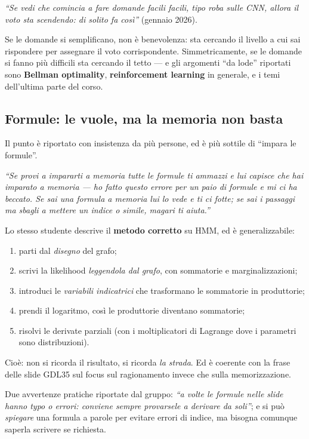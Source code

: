 \begin{tcolorbox}[mybox, title={Il segnale che il voto sta scendendo}]
\emph{``Se vedi che comincia a fare domande facili facili, tipo roba sulle CNN, allora il voto sta scendendo: di solito fa così''} (gennaio 2026).

Se le domande si semplificano, non è benevolenza: sta cercando il livello a cui sai rispondere per assegnare il voto corrispondente. Simmetricamente, se le domande si fanno più difficili sta cercando il tetto — e gli argomenti ``da lode'' riportati sono \textbf{Bellman optimality}, \textbf{reinforcement learning} in generale, e i temi dell'ultima parte del corso.
\end{tcolorbox}

\subsection*{Formule: le vuole, ma la memoria non basta}

Il punto è riportato con insistenza da più persone, ed è più sottile di ``impara le formule''.

\emph{``Se provi a impararti a memoria tutte le formule ti ammazzi e lui capisce che hai imparato a memoria --- ho fatto questo errore per un paio di formule e mi ci ha beccato. Se sai una formula a memoria lui lo vede e ti ci fotte; se sai i passaggi ma sbagli a mettere un indice o simile, magari ti aiuta.''}

Lo stesso studente descrive il \textbf{metodo corretto} su HMM, ed è generalizzabile:
\begin{enumerate}[leftmargin=2em]
  \item parti dal \emph{disegno} del grafo;
  \item scrivi la likelihood \emph{leggendola dal grafo}, con sommatorie e marginalizzazioni;
  \item introduci le \emph{variabili indicatrici} che trasformano le sommatorie in produttorie;
  \item prendi il logaritmo, così le produttorie diventano sommatorie;
  \item risolvi le derivate parziali (con i moltiplicatori di Lagrange dove i parametri sono distribuzioni).
\end{enumerate}
Cioè: non si ricorda il risultato, si ricorda \emph{la strada}. Ed è coerente con la frase delle slide GDL35 sul focus sul ragionamento invece che sulla memorizzazione.

Due avvertenze pratiche riportate dal gruppo: \emph{``a volte le formule nelle slide hanno typo o errori: conviene sempre provarsele a derivare da soli''}; e si può \emph{spiegare} una formula a parole per evitare errori di indice, ma bisogna comunque saperla scrivere se richiesta.

